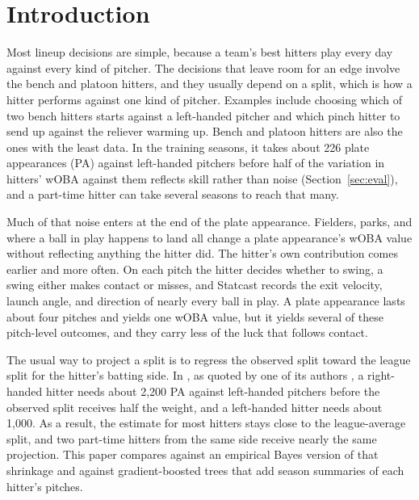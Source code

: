 \documentclass[11pt,letterpaper]{article}
\begin{document}
\section{Introduction}
\label{sec:intro}

Most lineup decisions are simple, because a team's best hitters play every day against every kind of pitcher. The decisions that leave room for an edge involve the bench and platoon hitters, and they usually depend on a split, which is how a hitter performs against one kind of pitcher. Examples include choosing which of two bench hitters starts against a left-handed pitcher and which pinch hitter to send up against the reliever warming up. Bench and platoon hitters are also the ones with the least data. In the training seasons, it takes about 226 plate appearances (PA) against left-handed pitchers before half of the variation in hitters' wOBA against them reflects skill rather than noise (Section~\ref{sec:eval}), and a part-time hitter can take several seasons to reach that many.

Much of that noise enters at the end of the plate appearance. Fielders, parks, and where a ball in play happens to land all change a plate appearance's wOBA value without reflecting anything the hitter did. The hitter's own contribution comes earlier and more often. On each pitch the hitter decides whether to swing, a swing either makes contact or misses, and Statcast records the exit velocity, launch angle, and direction of nearly every ball in play. A plate appearance lasts about four pitches and yields one wOBA value, but it yields several of these pitch-level outcomes, and they carry less of the luck that follows contact.

The usual way to project a split is to regress the observed split toward the league split for the hitter's batting side. In \citet[p.~157]{tango2007}, as quoted by one of its authors \citep{tango2009}, a right-handed hitter needs about 2,200 PA against left-handed pitchers before the observed split receives half the weight, and a left-handed hitter needs about 1,000. As a result, the estimate for most hitters stays close to the league-average split, and two part-time hitters from the same side receive nearly the same projection. This paper compares against an empirical Bayes version of that shrinkage \citep{efron1975} and against gradient-boosted trees \citep{chen2016} that add season summaries of each hitter's pitches.
\end{document}
